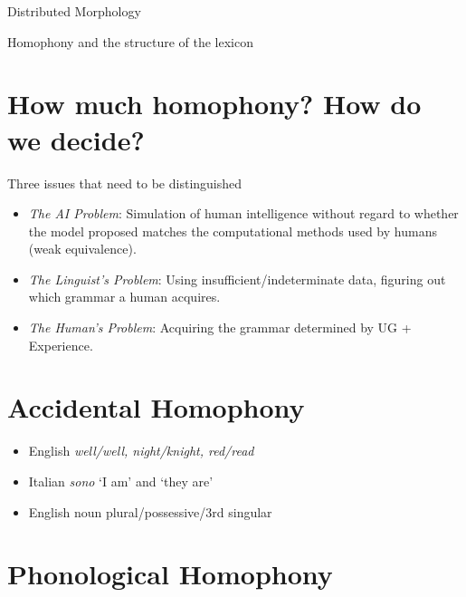 \documentclass[10pt]{article}
\newcounter{mine}
\begin{document}
\thispagestyle{empty}

\begin{center}
\noindent \large Distributed Morphology\\
\normalsize

\end{center}
\begin{center}{Homophony and the structure of the lexicon}
\end{center}

\section{How much homophony? How do we decide?}



\begin{example}\label{prob}Three issues that need to be distinguished
\begin{itemize}
\item{{\em The AI Problem}: Simulation of human intelligence  without regard to whether the model proposed matches the computational methods used by humans (weak equivalence).}
\item{{\em The Linguist's Problem}: Using insufficient/indeterminate data, figuring out which grammar a human acquires.}
\item{{\em The Human's Problem}: Acquiring the grammar determined by UG + Experience.}
\end{itemize}
\end{example}

\section{Accidental Homophony}

\begin{example}
\begin{itemize}
\item{English {\it well/well, night/knight, red/read}}
\item{Italian {\it sono} `I am' and `they are'}
\item{English {\sc noun plural/possessive/3rd singular}}
\end{itemize}
\end{example}


\section{Phonological Homophony}
\end{document}
